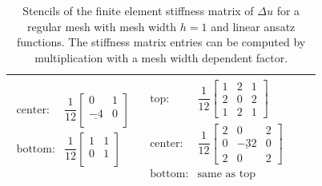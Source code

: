 \begin{table}
\begin{tabular}{|c|c|c|c}
\begin{minipage}{6cm}
\begin{equation*}
\begin{array}{ll}
        \text{center:} &
        \dfrac1{12}\left[\begin{array}{ccc}
            0 & 1\\
            \underline{-4} & 0\\
        \end{array}\right] \\[4mm]
        \text{bottom:}& 
        \dfrac1{12}\left[\begin{array}{ccc}
            1 & 1\\
            0 & 1\\
        \end{array}\right]
      \end{array}
    \end{equation*}
  \end{minipage} &
  \begin{minipage}{6cm}
    \begin{equation*}
      \begin{array}{ll}
        \text{top:} &
        \dfrac1{12}
        \left[\begin{array}{ccc}
            1 & 2 & 1\\
            2 & 0 & 2\\
            1 & 2 & 1
        \end{array}\right] \\[4mm]
        \text{center:} &
        \dfrac1{12}
        \left[\begin{array}{ccc}
            2 & 0 & 2\\
            0 & \underline{-32} & 0\\
            2 & 0 & 2
        \end{array}\right] \\[4mm]
        \text{bottom:}& \text{same as top}
      \end{array}  
    \end{equation*}
  \end{minipage}
  \\\hline
  \end{tabular}
  \caption{Stencils of the finite element stiffness matrix of $Δu$ for a regular mesh with mesh width $h=1$ and linear ansatz functions. The stiffness matrix entries can be computed by multiplication with a mesh width dependent factor.}
  \label{tab:stencils_laplace}
\end{table}

